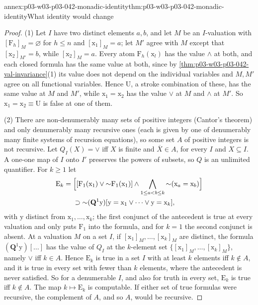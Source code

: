\begin{annexitem}{annex:p03-w03-p03-042-monadic-identity}{thm:p03-w03-p03-042-monadic-identity}{What identity would change}
\begin{proof}
(1) Let \(I\) have two distinct elements \(a,b\), and let \(M\) be an
\(I\)-valuation with \([\mathrm F_h]_M=\varnothing\) for \(h\leq n\) and
\([\mathrm x_1]_M=a\); let \(M'\) agree with \(M\) except that
\([\mathrm x_2]_{M'}=b\), while \([\mathrm x_2]_M=a\).  Every atom
\(\mathrm F_h(\mathrm x_l)\) has the value \(\wedge\) at both, and each
closed formula has the same value at both, since by
\cref{thm:p03-w03-p03-042-val-invariance}(1) its value does not depend on
the individual variables and \(M,M'\) agree on all functional variables.
Hence \(\mathrm U\), a stroke combination of these, has the same value at
\(M\) and \(M'\), while \(\mathrm x_1=\mathrm x_2\) has the value \(\vee\)
at \(M\) and \(\wedge\) at \(M'\).  So \(\mathrm x_1=\mathrm x_2\equiv
\mathrm U\) is false at one of them.

(2) There are non-denumerably many sets of positive integers (Cantor's
theorem) and only denumerably many recursive ones (each is given by one of
denumerably many finite systems of recursion equations), so some set \(A\)
of positive integers is not recursive.  Let \(Q_I(X)=\vee\) iff \(X\) is
finite and \(\overline X\in A\), for every \(I\) and \(X\subseteq I\).  A
one-one map of \(I\) onto \(I'\) preserves the powers of subsets, so
\(Q\) is an unlimited quantifier.  For \(k\geq1\) let
\[
 \begin{aligned}
 \mathrm E_k={}&\Bigl[[\mathrm F_1(\mathrm x_1)\vee{\sim}\mathrm
 F_1(\mathrm x_1)]\wedge\bigwedge_{1\leq a<b\leq k}{\sim}(\mathrm
 x_a=\mathrm x_b)\Bigr]\\
 &\supset{\sim}(\mathbf Q^1\mathrm y)[\mathrm
 y=\mathrm x_1\vee\cdots\vee\mathrm y=\mathrm x_k],
 \end{aligned}
\]
with \(\mathrm y\) distinct from \(\mathrm x_1,\ldots,\mathrm x_k\); the
first conjunct of the antecedent is true at every valuation and only puts
\(\mathrm F_1\) into the formula, and for \(k=1\) the second conjunct is
absent.  At a valuation \(M\) on a set \(I\),
if \([\mathrm x_1]_M,\ldots,[\mathrm x_k]_M\) are distinct, the formula
\((\mathbf Q^1\mathrm y)[\ldots]\) has the value of \(Q_I\) at the
\(k\)-element set \(\{[\mathrm x_1]_M,\ldots,[\mathrm x_k]_M\}\), namely
\(\vee\) iff \(k\in A\).  Hence \(\mathrm E_k\) is true in a set \(I\)
with at least \(k\) elements iff \(k\notin A\), and it is true in every
set with fewer than \(k\) elements, where the antecedent is never
satisfied.  So for a denumerable \(I\), and also for truth in every set,
\(\mathrm E_k\) is true iff \(k\notin A\).  The map \(k\mapsto\mathrm
E_k\) is computable.  If either set of true formulas were recursive, the
complement of \(A\), and so \(A\), would be recursive.
\end{proof}
\end{annexitem}

